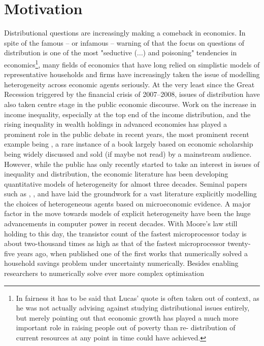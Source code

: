 \section{Motivation}
Distributional questions are increasingly making a comeback in economics. In spite
of the famous -- or infamous -- warning of \citet{Lucas2004} that the focus 
on questions of distribution is one of the most "seductive (...) and poisoning"
tendencies in economics\footnote{In fairness it has to be said that Lucas' quote
is often taken out of context, as he was not actually advising against studying 
distributional issues entirely, but merely pointing out that economic growth has
played a much more important role in raising people out of poverty than re-
distribution of current resources at any point in time could have achieved.},
many fields of economics that have long relied on simplistic models of representative
households and firms have increasingly taken the issue of modelling heterogeneity
across economic agents seriously. At the very least since the Great Recession
triggered by the financial crisis of 2007--2008, issues of distribution have also
taken centre stage in the public economic discourse. Work on the increase in 
income inequality, especially at the top end of the income distribution, and 
the rising inequality in wealth holdings in advanced economies has played a 
prominent role in the public debate in recent years, the most prominent recent
example being \citet{Piketty2014}, a rare instance of a book largely based on 
economic scholarship being widely discussed and sold (if maybe not read) by
a mainstream audience. However, while the public has only recently started to 
take an interest in issues of inequality and distribution, the economic literature
has been developing quantitative models of heterogeneity for almost three decades.
Seminal papers such as \citet{Imrohoroglu1989}, \citet{Huggett1993}, and
\citet{Aiyagari1994} have laid the groundwork for a vast literature explicitly 
modelling the choices of heterogeneous agents based on microeconomic evidence.
A major factor in the move towards models of explicit heterogeneity have been 
the huge advancements in computer power in recent decades. With Moore's law
still holding to this day, the transistor count of the fastest microprocessor
today is about two-thousand times as high as that of the fastest microprocessor
twenty-five years ago, when \citet{Zeldes1989} published one of the first works
that numerically solved a household savings problem under uncertainty numerically.
Besides enabling researchers to numerically solve ever more complex optimisation
